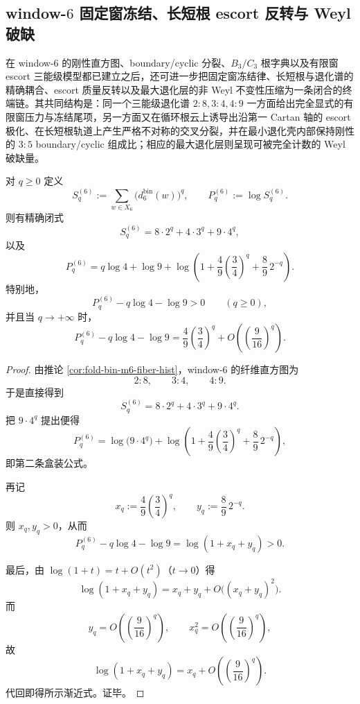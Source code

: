 \subsection{window-\texorpdfstring{$6$}{6} 固定窗冻结、长短根 escort 反转与 Weyl 破缺}\label{subsec:conclusion-window6-fixedfreezing-shortlong-escort-weyl}
在 window-\(6\) 的刚性直方图、boundary/cyclic 分裂、\(B_3/C_3\) 根字典以及有限窗 escort 三能级模型都已建立之后，还可进一步把固定窗冻结律、长短根与退化谱的精确耦合、escort 质量反转以及最大退化层的非 Weyl 不变性压缩为一条闭合的终端链。其共同结构是：同一个三能级退化谱 \(2:8,3:4,4:9\) 一方面给出完全显式的有限窗压力与冻结尾项，另一方面又在循环根云上诱导出沿第一 Cartan 轴的 escort 极化、在长短根轨道上产生严格不对称的交叉分裂，并在最小退化壳内部保持刚性的 \(3{:}5\) boundary/cyclic 组成比；相应的最大退化层则呈现可被完全计数的 Weyl 破缺量。

\begin{theorem}\label{thm:conclusion-window6-fixed-window-freezing-closed}
对 \(q\ge 0\) 定义
\[
S_q^{(6)}
:=
\sum_{w\in X_6}\bigl(d_6^{\mathrm{bin}}(w)\bigr)^q,
\qquad
P_q^{(6)}:=\log S_q^{(6)}.
\]
则有精确闭式
\[
\boxed{\;
S_q^{(6)}=8\cdot 2^q+4\cdot 3^q+9\cdot 4^q,\;}
\]
以及
\[
\boxed{\;
P_q^{(6)}
=
q\log 4+\log 9
+\log\!\left(
1+\frac49\left(\frac34\right)^q+\frac89\,2^{-q}
\right).\;}
\]
特别地，
\[
\boxed{\;
P_q^{(6)}-q\log 4-\log 9>0\qquad(q\ge 0),\;}
\]
并且当 \(q\to+\infty\) 时，
\[
\boxed{\;
P_q^{(6)}-q\log 4-\log 9
=
\frac49\left(\frac34\right)^q
+O\!\left(\left(\frac{9}{16}\right)^q\right).\;}
\]
\end{theorem}
\begin{proof}
由推论 \ref{cor:fold-bin-m6-fiber-hist}，window-\(6\) 的纤维直方图为
\[
2:8,\qquad 3:4,\qquad 4:9.
\]
于是直接得到
\[
S_q^{(6)}=8\cdot 2^q+4\cdot 3^q+9\cdot 4^q.
\]
把 \(9\cdot 4^q\) 提出便得
\[
P_q^{(6)}
=
\log\!\bigl(9\cdot 4^q\bigr)
+\log\!\left(
1+\frac49\left(\frac34\right)^q+\frac89\,2^{-q}
\right),
\]
即第二条盒装公式。

再记
\[
x_q:=\frac49\left(\frac34\right)^q,
\qquad
y_q:=\frac89\,2^{-q}.
\]
则 \(x_q,y_q>0\)，从而
\[
P_q^{(6)}-q\log 4-\log 9=\log(1+x_q+y_q)>0.
\]

最后，由 \(\log(1+t)=t+O(t^2)\)（\(t\to 0\)）得
\[
\log(1+x_q+y_q)=x_q+y_q+O\bigl((x_q+y_q)^2\bigr).
\]
而
\[
y_q=O\!\left(\left(\frac{9}{16}\right)^q\right),
\qquad
x_q^2=O\!\left(\left(\frac{9}{16}\right)^q\right),
\]
故
\[
\log(1+x_q+y_q)
=
x_q+O\!\left(\left(\frac{9}{16}\right)^q\right).
\]
代回即得所示渐近式。证毕。
\end{proof}

